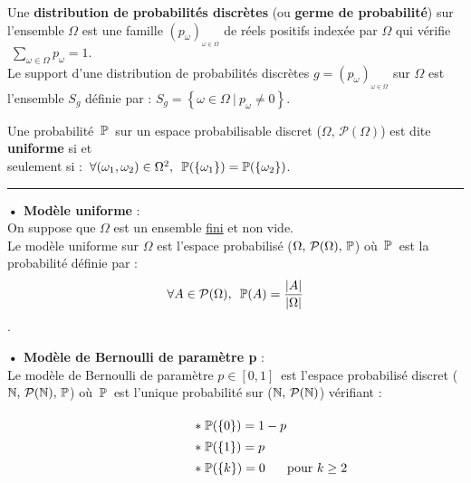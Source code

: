 \newpage


Une \textbf{distribution de probabilités discrètes} (ou \textbf{germe de probabilité}) sur l'ensemble \(\Omega\) est une famille \((p_\omega)_{_{\omega \in \Omega}}\) de réels positifs indexée par \(\Omega\) qui vérifie \(\displaystyle\; \sum_{\omega \in \Omega}p_\omega=1.\)\vspace{0.2cm}\\
Le support d'une distribution de probabilités discrètes \(g=(p_\omega)_{_{\omega \in \Omega}}\) sur \(\Omega\) est l'ensemble \(S_g\) définie par : \(\displaystyle S_g=\left\{\omega \in \Omega \ \rvert \ p_\omega \neq 0 \right\}.\)

\vspace{1.3cm}


Une probabilité \(\,\mathbb{P}\,\) sur un espace probabilisable discret (\(\Omega,\,\mathcal{P}(\Omega)\)) est dite \textbf{uniforme} si et\\
seulement si : \(\,\forall (\omega_1,\omega_2)\in \Omega^2,\ \, \mathbb{P}(\{\omega_1\})=\mathbb{P}(\{\omega_2\})\).
\vspace{1cm}
\hrule

\vspace{1cm}

\textbf{• Modèle uniforme} :\vspace{0.2cm}\\
On suppose que \(\Omega\) est un ensemble \underline{fini} et non vide.\\
Le modèle uniforme sur \(\Omega\) est l'espace probabilisé (\(\Omega,\,\mathcal{P}(\Omega),\,\mathbb{P}\)) où \(\,\mathbb{P}\,\) est la probabilité définie par :\vspace{-0.2cm}
\[\forall A\in \mathcal{P}(\Omega),\ \, \mathbb{P}(A)=\frac{|A|}{|\Omega|}\].
\vspace{0.4cm}

\textbf{• Modèle de Bernoulli de paramètre p} :\vspace{0.2cm}\\
Le modèle de Bernoulli de paramètre \(p\in [0,1]\,\) est l'espace probabilisé discret (\(\mathbb{N},\,\mathcal{P}(\mathbb{N}),\,\mathbb{P}\)) où \(\,\mathbb{P}\,\) est l'unique probabilité sur (\(\mathbb{N},\,\mathcal{P}(\mathbb{N})\)) vérifiant :\vspace{-0.3cm}

\[\hspace{2cm} \def\arraystretch{1.4} \arraycolsep=0.01cm
\begin{array}{ll}
    \ast \; \PP(\{0\})=1-p & \\
    \ast \; \PP(\{1\})=p & \\
    \ast \; \PP(\{k\})=0 & \text{pour } k\geq 2
\end{array}\]


